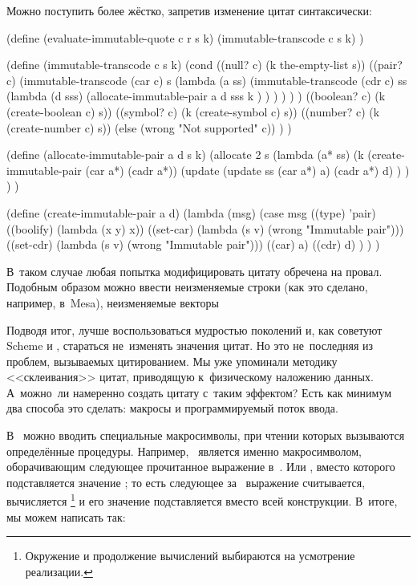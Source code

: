 Можно поступить более жёстко, запретив изменение цитат синтаксически:

\begin{code:lisp}
(define (evaluate-immutable-quote c r s k)
  (immutable-transcode c s k) )

(define (immutable-transcode c s k)
  (cond
    ((null? c)    (k the-empty-list s))
    ((pair? c)
     (immutable-transcode
      (car c) s (lambda (a ss)
                  (immutable-transcode
                   (cdr c) ss (lambda (d sss)
                                (allocate-immutable-pair
                                 a d sss k ) ) ) ) ) )
    ((boolean? c) (k (create-boolean c) s))
    ((symbol? c)  (k (create-symbol c) s))
    ((number? c)  (k (create-number c) s))
    (else (wrong "Not supported" c)) ) )

(define (allocate-immutable-pair a d s k)
  (allocate 2 s
   (lambda (a* ss)
     (k (create-immutable-pair (car a*) (cadr a*))
        (update (update ss (car a*) a) (cadr a*) d) ) ) ) )

(define (create-immutable-pair a d)
  (lambda (msg)
    (case msg
      ((type)    'pair)
      ((boolify) (lambda (x y) x))
      ((set-car) (lambda (s v) (wrong "Immutable pair")))
      ((set-cdr) (lambda (s v) (wrong "Immutable pair")))
      ((car)     a)
      ((cdr)     d) ) ) )
\end{code:lisp}

В~таком случае любая попытка модифицировать цитату обречена на провал. Подобным
образом можно ввести неизменяемые строки (как это сделано, например, в~Mesa),
неизменяемые векторы {\itd}

Подводя итог, лучше воспользоваться мудростью поколений и, как советуют Scheme и
{\CommonLisp}, стараться не~изменять значения цитат. Но это не~последняя из
проблем, вызываемых цитированием. Мы уже упоминали методику <<склеивания>>
цитат, приводящую к~физическому наложению данных. А~можно~ли намеренно создать
цитату с~таким эффектом? Есть как минимум два способа это сделать: макросы и
программируемый поток ввода.

В~{\CommonLisp} можно вводить специальные макросимволы, при чтении которых
вызываются определённые процедуры. Например, ~является именно
макросимволом, оборачивающим следующее прочитанное выражение в~. Или
, вместо которого подставляется значение ;
то есть следующее за~ выражение считывается, вычисляется%
\footnote{Окружение и продолжение вычислений выбираются на усмотрение
реализации.} и его значение подставляется вместо всей конструкции. В~итоге, мы
можем написать так:

